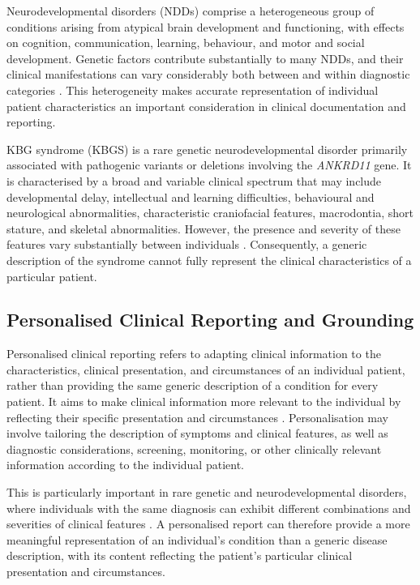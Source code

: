 \documentclass[ %
                    author={Aman Kumar Singh},
                supervisor={Dr. Edwin Simpson},
                    degree={MSc},
                     title={Quality-Aware Knowledge Distillation of Large Language Models for Efficient Personalised Clinical Report Generation},
                  subtitle={},
                      type={},
                      year={2021}]{dissertation}
\begin{document}
Neurodevelopmental disorders (NDDs) comprise a heterogeneous group of
conditions arising from atypical brain development and functioning, with
effects on cognition, communication, learning, behaviour, and motor and
social development. Genetic factors contribute substantially to many NDDs,
and their clinical manifestations can vary considerably both between and
within diagnostic categories \cite{gao_genetic_2025,assadourian_precision_2025}.
This heterogeneity makes accurate representation of individual patient
characteristics an important consideration in clinical documentation and
reporting.

KBG syndrome (KBGS) is a rare genetic neurodevelopmental disorder primarily
associated with pathogenic variants or deletions involving the
\textit{ANKRD11} gene. It is characterised by a broad and variable clinical
spectrum that may include developmental delay, intellectual and learning
difficulties, behavioural and neurological abnormalities, characteristic
craniofacial features, macrodontia, short stature, and skeletal
abnormalities. However, the presence and severity of these features vary
substantially between individuals \cite{martinez-cayuelas_clinical_2023}.
Consequently, a generic description of the syndrome cannot fully represent
the clinical characteristics of a particular patient.
\subsection{Personalised Clinical Reporting and Grounding}
\label{sec:clinical_personalisation_grounding}

Personalised clinical reporting refers to adapting clinical information to
the characteristics, clinical presentation, and circumstances of an
individual patient, rather than providing the same generic description of a
condition for every patient. It aims to make clinical information more
relevant to the individual by reflecting their specific presentation and
circumstances \cite{yang_knowledge_2022}. Personalisation may involve
tailoring the description of symptoms and clinical features, as well as
diagnostic considerations, screening, monitoring, or other clinically
relevant information according to the individual patient.

This is particularly important in rare genetic and neurodevelopmental
disorders, where individuals with the same diagnosis can exhibit different
combinations and severities of clinical features
\cite{martinez-cayuelas_clinical_2023}. A personalised report can therefore
provide a more meaningful representation of an individual's condition than
a generic disease description, with its content reflecting the patient's
particular clinical presentation and circumstances.
\end{document}
